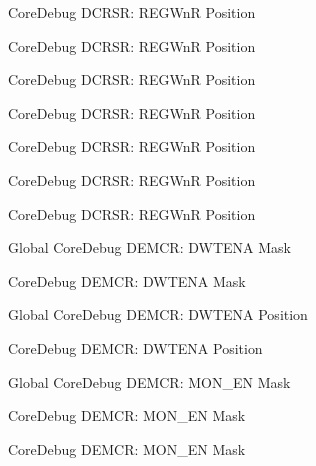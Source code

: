 \begin{DoxyRefList}
\label{deprecated__deprecated000403}%
%
Core\+Debug DCRSR\+: REGWnR Position 

\label{deprecated__deprecated000327}%
%
Core\+Debug DCRSR\+: REGWnR Position 

\label{deprecated__deprecated000268}%
%
Core\+Debug DCRSR\+: REGWnR Position 

\label{deprecated__deprecated000594}%
%
Core\+Debug DCRSR\+: REGWnR Position 

\label{deprecated__deprecated000041}%
%
Core\+Debug DCRSR\+: REGWnR Position 

\label{deprecated__deprecated000129}%
%
Core\+Debug DCRSR\+: REGWnR Position 

\label{deprecated__deprecated000492}%
%
Core\+Debug DCRSR\+: REGWnR Position  
\item[Global \doxylink{group___c_m_s_i_s___core_debug_ga2fcc0b8f174e85379d38e1cb74b8c627}{Core\+Debug\+\_\+\+DEMCR\+\_\+\+DWTENA\+\_\+\+Msk} ]\label{deprecated__deprecated000273}%
%
Core\+Debug DEMCR\+: DWTENA Mask 

\label{deprecated__deprecated000134}%
%
Core\+Debug DEMCR\+: DWTENA Mask  
\item[Global \doxylink{group___c_m_s_i_s___core_debug_ga0cde79c4e741e1eed0513c1f985baeb9}{Core\+Debug\+\_\+\+DEMCR\+\_\+\+DWTENA\+\_\+\+Pos} ]\label{deprecated__deprecated000272}%
%
Core\+Debug DEMCR\+: DWTENA Position 

\label{deprecated__deprecated000133}%
%
Core\+Debug DEMCR\+: DWTENA Position  
\item[Global \doxylink{group___c_m_s_i_s___core_debug_gac2b46b9b65bf8d23027f255fc9641977}{Core\+Debug\+\_\+\+DEMCR\+\_\+\+MON\+\_\+\+EN\+\_\+\+Msk} ]\label{deprecated__deprecated000054}%
%
Core\+Debug DEMCR\+: MON\+\_\+\+EN Mask 

\label{deprecated__deprecated000607}%
%
Core\+Debug DEMCR\+: MON\+\_\+\+EN Mask 

\label{deprecated__deprecated000416}%
%
Core\+Debug DEMCR\+: MON\+\_\+\+EN Mask 


\end{DoxyRefList}
